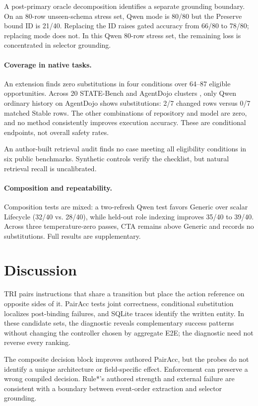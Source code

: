 \documentclass[letterpaper]{article}
\begin{document}
A post-primary oracle decomposition identifies a separate grounding boundary. On an 80-row
unseen-schema stress set, Qwen mode is 80/80 but the Preserve bound ID is 21/40. Replacing the ID
raises gated accuracy from 66/80 to 78/80; replacing mode does not. In this Qwen 80-row stress set,
the remaining loss is concentrated in selector grounding.

\paragraph{Coverage in native tasks.}
An extension finds zero substitutions in four conditions over 64--87 eligible opportunities.
Across 20 STATE-Bench and AgentDojo clusters
\cite{microsoft2026statebench,debenedetti2024agentdojo}, only Qwen ordinary history on AgentDojo
shows substitutions: 2/7 changed rows versus 0/7 matched Stable rows. The other combinations of
repository and model are zero, and no method consistently improves execution accuracy. These are
conditional endpoints, not overall safety rates.

An author-built retrieval audit finds no case meeting all eligibility conditions in six public
benchmarks. Synthetic controls verify the checklist, but natural retrieval recall is uncalibrated.

\paragraph{Composition and repeatability.}
Composition tests are mixed: a two-refresh Qwen test favors Generic over scalar Lifecycle (32/40
vs. 28/40), while held-out role indexing improves 35/40 to 39/40. Across three temperature-zero
passes, CTA remains above Generic and records no substitutions. Full results are supplementary.

\section{Discussion}

TRI pairs instructions that share a transition but place the action reference on opposite sides of
it. PairAcc tests joint correctness, conditional substitution localizes post-binding failures, and
SQLite traces identify the written entity. In these candidate sets, the diagnostic reveals
complementary success patterns without changing the controller chosen by aggregate E2E; the
diagnostic need not reverse every ranking.

The composite decision block improves authored PairAcc, but the probes do not identify a unique
architecture or field-specific effect. Enforcement can preserve a wrong compiled decision. Rule*'s
authored strength and external failure are consistent with a boundary between event-order
extraction and selector grounding.
\end{document}
